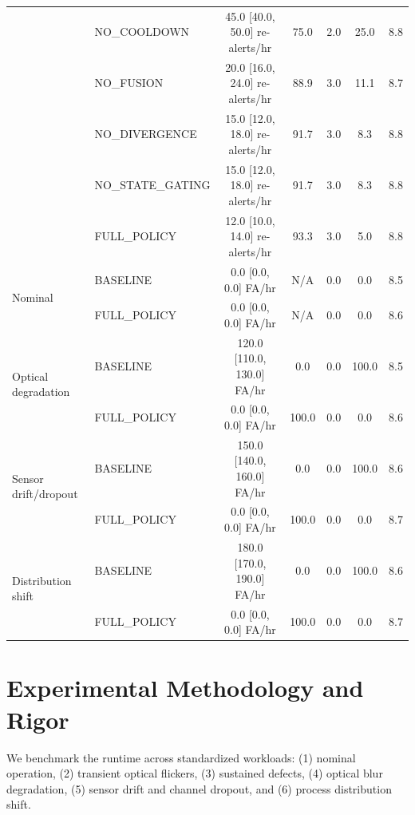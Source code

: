 \documentclass[conference]{IEEEtran}
\begin{document}
\begin{table}[!t]
{\begin{tabular}{llccccc}
        & NO\_COOLDOWN & 45.0 [40.0, 50.0] re-alerts/hr & 75.0 & 2.0 & 25.0 & 8.8 \\
        & NO\_FUSION & 20.0 [16.0, 24.0] re-alerts/hr & 88.9 & 3.0 & 11.1 & 8.7 \\
        & NO\_DIVERGENCE & 15.0 [12.0, 18.0] re-alerts/hr & 91.7 & 3.0 & 8.3 & 8.8 \\
        & NO\_STATE\_GATING & 15.0 [12.0, 18.0] re-alerts/hr & 91.7 & 3.0 & 8.3 & 8.8 \\
        & FULL\_POLICY & 12.0 [10.0, 14.0] re-alerts/hr & 93.3 & 3.0 & 5.0 & 8.8 \\
        \midrule
        \multirow{2}{*}{Nominal}
        & BASELINE & 0.0 [0.0, 0.0] FA/hr & N/A & 0.0 & 0.0 & 8.5 \\
        & FULL\_POLICY & 0.0 [0.0, 0.0] FA/hr & N/A & 0.0 & 0.0 & 8.6 \\
        \midrule
        \multirow{2}{*}{Optical degradation}
        & BASELINE & 120.0 [110.0, 130.0] FA/hr & 0.0 & 0.0 & 100.0 & 8.5 \\
        & FULL\_POLICY & 0.0 [0.0, 0.0] FA/hr & 100.0 & 0.0 & 0.0 & 8.6 \\
        \midrule
        \multirow{2}{*}{Sensor drift/dropout}
        & BASELINE & 150.0 [140.0, 160.0] FA/hr & 0.0 & 0.0 & 100.0 & 8.6 \\
        & FULL\_POLICY & 0.0 [0.0, 0.0] FA/hr & 100.0 & 0.0 & 0.0 & 8.7 \\
        \midrule
        \multirow{2}{*}{Distribution shift}
        & BASELINE & 180.0 [170.0, 190.0] FA/hr & 0.0 & 0.0 & 100.0 & 8.6 \\
        & FULL\_POLICY & 0.0 [0.0, 0.0] FA/hr & 100.0 & 0.0 & 0.0 & 8.7 \\
        \bottomrule
    \end{tabular}%
    }
\end{table}


\section{Experimental Methodology and Rigor}
We benchmark the runtime across \TotalWorkloadScenarios{} standardized workloads: (1) nominal operation, (2) transient optical flickers, (3) sustained defects, (4) optical blur degradation, (5) sensor drift and channel dropout, and (6) process distribution shift.
\end{document}
